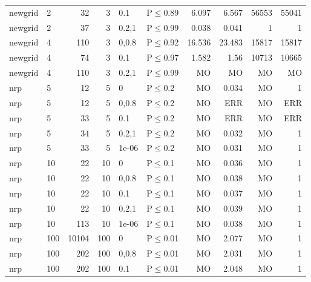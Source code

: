 \begin{longtable}{llrrllrrrr}
 newgrid       & 2        &     	32 &   3 & 0.1   & P$\leq$0.89  & 6.097    & 6.567    & 56553   & 55041  \\
 newgrid       & 2        &     	37 &   3 & 0.2,1 & P$\leq$0.99  & 0.038    & 0.041    & 1       & 1      \\
 newgrid       & 4        &    	110 &   3 & 0,0.8 & P$\leq$0.92  & 16.536   & 23.483   & 15817   & 15817  \\
 newgrid       & 4        &     	74 &   3 & 0.1   & P$\leq$0.97  & 1.582    & 1.56     & 10713   & 10665  \\
 newgrid       & 4        &    	110 &   3 & 0.2,1 & P$\leq$0.99  & MO       & MO       & MO      & MO     \\
 nrp           & 5        &     	12 &   5 & 0     & P$\leq$0.2   & MO       & 0.034    & MO      & 1      \\
 nrp           & 5        &     	12 &   5 & 0,0.8 & P$\leq$0.2   & MO       & ERR      & MO      & ERR    \\
 nrp           & 5        &     	33 &   5 & 0.1   & P$\leq$0.2   & MO       & ERR      & MO      & ERR    \\
 nrp           & 5        &     	34 &   5 & 0.2,1 & P$\leq$0.2   & MO       & 0.032    & MO      & 1      \\
 nrp           & 5        &     	33 &   5 & 1e-06 & P$\leq$0.2   & MO       & 0.031    & MO      & 1      \\
 nrp           & 10       &     	22 &  10 & 0     & P$\leq$0.1   & MO       & 0.036    & MO      & 1      \\
 nrp           & 10       &     	22 &  10 & 0,0.8 & P$\leq$0.1   & MO       & 0.038    & MO      & 1      \\
 nrp           & 10       &     	22 &  10 & 0.1   & P$\leq$0.1   & MO       & 0.037    & MO      & 1      \\
 nrp           & 10       &     	22 &  10 & 0.2,1 & P$\leq$0.1   & MO       & 0.039    & MO      & 1      \\
 nrp           & 10       &    	113 &  10 & 1e-06 & P$\leq$0.1   & MO       & 0.038    & MO      & 1      \\
 nrp           & 100      &  	10104 & 100 & 0     & P$\leq$0.01  & MO       & 2.077    & MO      & 1      \\
 nrp           & 100      &    	202 & 100 & 0,0.8 & P$\leq$0.01  & MO       & 2.031    & MO      & 1      \\
 nrp           & 100      &    	202 & 100 & 0.1   & P$\leq$0.01  & MO       & 2.048    & MO      & 1      \\

\end{longtable}
